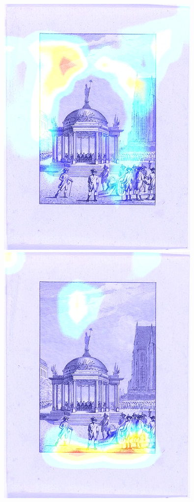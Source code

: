\begin{figure}[!htb]
  \includegraphics[width=\linewidth]{./Images/Chapter04/imagenet_saliencies_2.jpeg}
\endminipage
{}
  \includegraphics[width=\linewidth]{./Images/Chapter04/rijksnet_saliencies_2.jpeg}

\end{figure}
